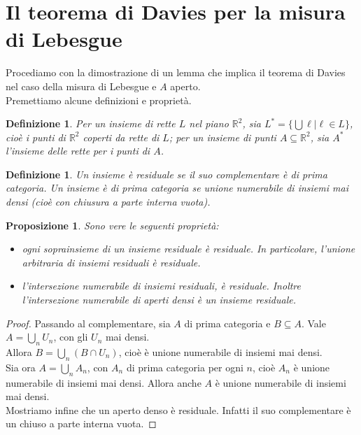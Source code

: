 \documentclass[a4paper, twoside,openright]{article}
\newcommand{\R}{\mathbb{R}}
\newcommand{\<}{\langle}
\renewcommand{\>}{\rangle}
\newtheorem{defin}[teo]{Definizione}
\newtheorem{prop}[teo]{Proposizione}
\begin{document}
	
\newpage

\section{Il teorema di Davies per la misura di Lebesgue}

Procediamo con la dimostrazione di un lemma che implica il teorema di Davies nel caso della misura di Lebesgue e $A$ aperto.\\
Premettiamo alcune definizioni e proprietà.

\begin{defin}
Per un insieme di rette $L$ nel piano $\R^2$, sia $L^{*}= \{\bigcup \ell | \ell \in L\}$, cioè i punti di $\R^2$ coperti da rette di $L$; per un insieme di punti $A \subseteq \R^2$, sia $A^{*}$ l'insieme delle rette per i punti di $A$.
\end{defin}

\begin{defin}
	Un insieme è residuale se il suo complementare è di prima categoria. Un insieme è di prima categoria se unione numerabile di insiemi mai densi (cioè con chiusura a parte interna vuota).
\end{defin}

\begin{prop} \label{prop}
	Sono vere le seguenti proprietà:
	\begin{itemize}
		\item ogni soprainsieme di un insieme residuale è residuale. In particolare, l'unione arbitraria di insiemi residuali è residuale.
		\item l'intersezione numerabile di insiemi residuali, è residuale. Inoltre l'intersezione numerabile di aperti densi è un insieme residuale.
	\end{itemize}
\end{prop}
\begin{proof}
	Passando al complementare, sia $A$ di prima categoria e $B \subseteq A$. Vale $A= \bigcup_n U_n$, con gli $U_n$ mai densi.\\
	Allora $B= \bigcup_n(B \cap U_n)$, cioè è unione numerabile di insiemi mai densi.\\
	Sia ora $A=\bigcup_nA_n$, con $A_n$ di prima categoria per ogni $n$, cioè $A_n$ è unione numerabile di insiemi mai densi. Allora anche $A$ è unione numerabile di insiemi mai densi.\\
	Mostriamo infine che un aperto denso è residuale. Infatti il suo complementare è un chiuso a parte interna vuota.	
\end{proof}
\end{document}
